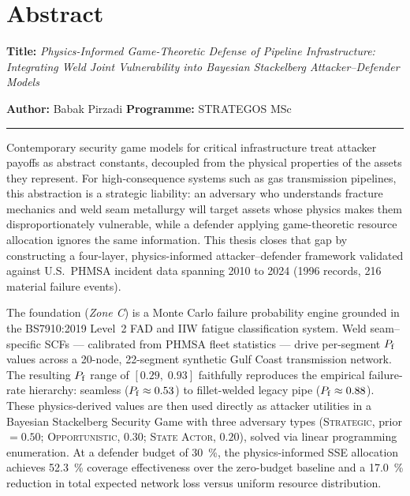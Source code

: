 
\chapter*{Abstract}
\thispagestyle{plain}

\noindent\textbf{Title:}
\textit{Physics-Informed Game-Theoretic Defense of Pipeline Infrastructure:
Integrating Weld Joint Vulnerability into Bayesian Stackelberg Attacker--Defender
Models}

\medskip
\noindent\textbf{Author:} Babak Pirzadi \hfill
\textbf{Programme:} STRATEGOS MSc

\vspace{0.8em}
\noindent\rule{\textwidth}{0.4pt}
\vspace{0.6em}


Contemporary security game models for critical infrastructure treat attacker
payoffs as abstract constants, decoupled from the physical properties of
the assets they represent.  For high-consequence systems such as gas
transmission pipelines, this abstraction is a strategic liability: an
adversary who understands fracture mechanics and weld seam metallurgy will
target assets whose physics makes them disproportionately vulnerable, while
a defender applying game-theoretic resource allocation ignores the same
information.  This thesis closes that gap by constructing a four-layer,
physics-informed attacker--defender framework validated against
U.S.\ \ac{PHMSA} incident data spanning 2010 to 2024 (\num{1996} records,
216 material failure events).

The foundation (\emph{Zone C}) is a Monte Carlo failure probability engine
grounded in the \ac{BS7910}:2019 Level~2 \ac{FAD} and \ac{IIW} fatigue
classification system.  Weld seam--specific \acp{SCF} — calibrated from
\ac{PHMSA} fleet statistics — drive per-segment $P_{\mathrm{f}}$ values across a
20-node, 22-segment synthetic Gulf Coast transmission network.  The
resulting $P_{\mathrm{f}}$ range of $[\num{0.29},\; \num{0.93}]$ faithfully
reproduces the empirical failure-rate hierarchy: seamless ($P_{\mathrm{f}} \approx
0.53$) to fillet-welded legacy pipe ($P_{\mathrm{f}} \approx 0.88$).
These physics-derived values are then used directly as attacker utilities
in a Bayesian Stackelberg Security Game with three adversary types
(\textsc{Strategic}, prior $= \num{0.50}$; \textsc{Opportunistic},
$\num{0.30}$; \textsc{State Actor}, $\num{0.20}$), solved via linear
programming enumeration.  At a defender budget of \SI{30}{\percent}, the
physics-informed \ac{SSE} allocation achieves \SI{+52.3}{\percent}
coverage effectiveness over the zero-budget baseline and a
\SI{17.0}{\percent} reduction in total expected network loss versus uniform
resource distribution.

